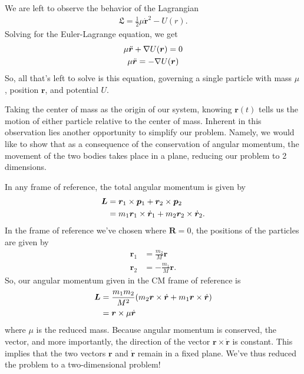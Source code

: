\documentclass[10pt, psamsfonts]{amsart}
\theoremstyle{definition}
\theoremstyle{remark}
\numberwithin{equation}{section}
\begin{document}
We are left to observe the behavior of the Lagrangian
\begin{align}
  \label{eq:One Param Lag}
  \mathfrak{L} = \frac{1}{2} \mu \dot{\bm{r}}^2 - U(r).
\end{align}
Solving for the Euler-Lagrange equation, we get
\begin{gather}
  \label{eq:One Param EL}
  \mu \ddot{\bm{r}} + \nabla U(\bm{r}) = 0 \notag \\
  \mu \ddot{\bm{r}} = -\nabla U(\bm{r})
\end{gather}
\noindent So, all that's left to solve is this equation, governing a single particle with mass $\mu$, position $\bm{r}$, and potential $U$.

Taking the center of mass as the origin of our system, knowing $\bm{r}(t)$ tells us the motion of either particle relative to the center of mass. Inherent in this observation lies another opportunity to simplify our problem. Namely, we would like to show that as a consequence of the conservation of angular momentum, the movement of the two bodies takes place in a plane, reducing our problem to 2 dimensions.

In any frame of reference, the total angular momentum is given by
\begin{align}
  \label{eq: Angular Momentum General Frame}
  \bm{L} & = \bm{r}_1 \times \bm{p}_1 + \bm{r}_2 \times \bm{p}_2 \notag \\
         & = m_1 \bm{r}_1 \times \dot{\bm{r}}_1 + m_2 \bm{r}_2 \times \dot{\bm{r}}_2.
\end{align}
In the frame of reference we've chosen where $\bm{R} = 0$, the positions of the particles are given by
\begin{align*}
  \bm{r}_1 &= \frac{m_2}{M} \bm{r}\\
  \bm{r}_2 &= -\frac{m_1}{M} \bm{r}.
\end{align*}
\noindent So, our angular momentum given in the CM frame of reference is
\begin{align}
  \label{eq:Angular Momentum CM Frame}
  \bm{L} &= \frac{m_1 m_2}{M^2} (m_2 \bm{r} \times \dot{\bm{r}} + m_1 \bm{r} \times \dot{\bm{r}}) \notag \\
         &= \bm{r} \times \mu \dot{\bm{r}}
\end{align}
where $\mu$ is the reduced mass. Because angular momentum is conserved, the vector, and more importantly, the direction of the vector $\bm{r} \times \dot{\bm{r}}$ is constant. This implies that the two vectors $\bm{r}$ and $\dot{\bm{r}}$ remain in a fixed plane. We've thus reduced the problem to a two-dimensional problem!
\end{document}
